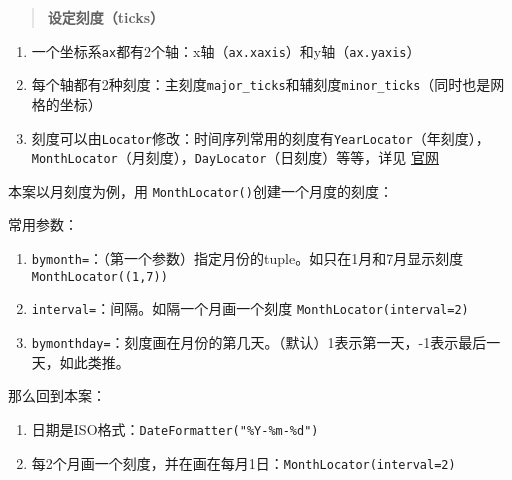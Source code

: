 \documentclass[
  letterpaper,
  DIV=11,
  numbers=noendperiod]{scrreprt}
\providecommand{\tightlist}{%
  \setlength{\itemsep}{0pt}\setlength{\parskip}{0pt}}\usepackage{longtable,booktabs,array}
\begin{document}
\begin{quote}
\textbf{设定刻度（ticks）}
\end{quote}

\begin{enumerate}
\def\labelenumi{\arabic{enumi}.}
\tightlist
\item
  一个坐标系\texttt{ax}都有2个轴：x轴（\texttt{ax.xaxis}）和y轴（\texttt{ax.yaxis}）
\item
  每个轴都有2种刻度：主刻度\texttt{major\_ticks}和辅刻度\texttt{minor\_ticks}（同时也是网格的坐标）
\item
  刻度可以由\texttt{Locator}修改：时间序列常用的刻度有\texttt{YearLocator}（年刻度），\texttt{MonthLocator}（月刻度），\texttt{DayLocator}（日刻度）等等，详见
  \href{https://matplotlib.org/stable/api/dates_api.html}{官网}
\end{enumerate}

本案以月刻度为例，用 \texttt{MonthLocator()}创建一个月度的刻度：

常用参数：

\begin{enumerate}
\def\labelenumi{\arabic{enumi}.}
\tightlist
\item
  \texttt{bymonth=}：（第一个参数）指定月份的tuple。如只在1月和7月显示刻度
  \texttt{MonthLocator((1,7))}
\item
  \texttt{interval=}：间隔。如隔一个月画一个刻度
  \texttt{MonthLocator(interval=2)}
\item
  \texttt{bymonthday=}：刻度画在月份的第几天。（默认）1表示第一天，-1表示最后一天，如此类推。
\end{enumerate}

那么回到本案：

\begin{enumerate}
\def\labelenumi{\arabic{enumi}.}
\tightlist
\item
  日期是ISO格式：\texttt{DateFormatter("\%Y-\%m-\%d")}
\item
  每2个月画一个刻度，并在画在每月1日：\texttt{MonthLocator(interval=2)}
\end{enumerate}
\end{document}
